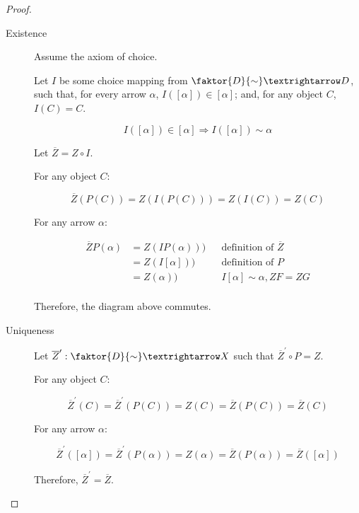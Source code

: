 \documentclass[a4paper,notitlepage]{article}
\begin{document}
\begin{enumerate}
\begin{proof}
\begin{itemize}
          \begin{description}
            \item[Existence]

              Assume the axiom of choice.
              
              Let $I$ be some choice mapping from $\faktor{D}{\sim} → D$,
              such that, for every arrow $α$, $I([α]) ∈ [α]$; and, for
              any object $C$, $I(C) = C$.

              $$I([α]) ∈ [α] \Rightarrow I([α]) \sim α$$

              Let $\overline{Z} = Z \circ I$. 

              For any object $C$:
              
              $$\overline{Z}(P(C)) = Z(I(P(C))) = Z(I(C)) = Z(C)$$ 

              For any arrow $α$:
              
              \begin{align*}
                    \overline{Z} P(α) &= Z (I P(α)))         && \text{definition of $\overline{Z}$}   \\
                                 &= Z (I [α]))              && \text{definition of $P$}   \\
                                 &= Z (α))                   && \text{$I[α] \sim α, ZF = ZG$}   \\
              \end{align*}  

              Therefore, the diagram above commutes.
                    
             \item[Uniqueness]
                    
                Let $\overline{Z}^\prime : \faktor{D}{\sim} → X$ such
                that $\overline{Z}^\prime \circ P = Z$.

                For any object $C$:

                $$\overline{Z}^\prime(C) = \overline{Z}^\prime(P(C)) = Z(C) = \overline{Z}(P(C)) = \overline{Z}(C)$$ 

                For any arrow $α$:

                $$\overline{Z}^\prime([α]) = \overline{Z}^\prime(P(α)) = Z(α) = \overline{Z}(P(α)) = \overline{Z}([α])$$

                Therefore, $\overline{Z}^\prime = \overline{Z}$.
         
         \end{description}
    \end{itemize}    
  \end{proof}
\end{enumerate}
\end{document}
